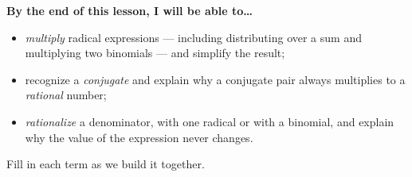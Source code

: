\documentclass[10pt]{article}
\begin{document}
\namedateperiod

\vspace{0.08in}

\begin{objectivebox}
\textbf{By the end of this lesson, I will be able to\dots}
\begin{itemize}\setlength{\itemsep}{2pt}
  \item \emph{multiply} radical expressions --- including distributing over a sum and multiplying two binomials --- and simplify the result;
  \item recognize a \emph{conjugate} and explain why a conjugate pair always multiplies to a \emph{rational} number;
  \item \emph{rationalize} a denominator, with one radical or with a binomial, and explain why the value of the expression never changes.
\end{itemize}
\end{objectivebox}

\vspace{0.05in}

\begin{vocabbox}
\small
Fill in each term as we build it together.
\par\vspace{2pt}   %
\end{vocabbox}
\end{document}
